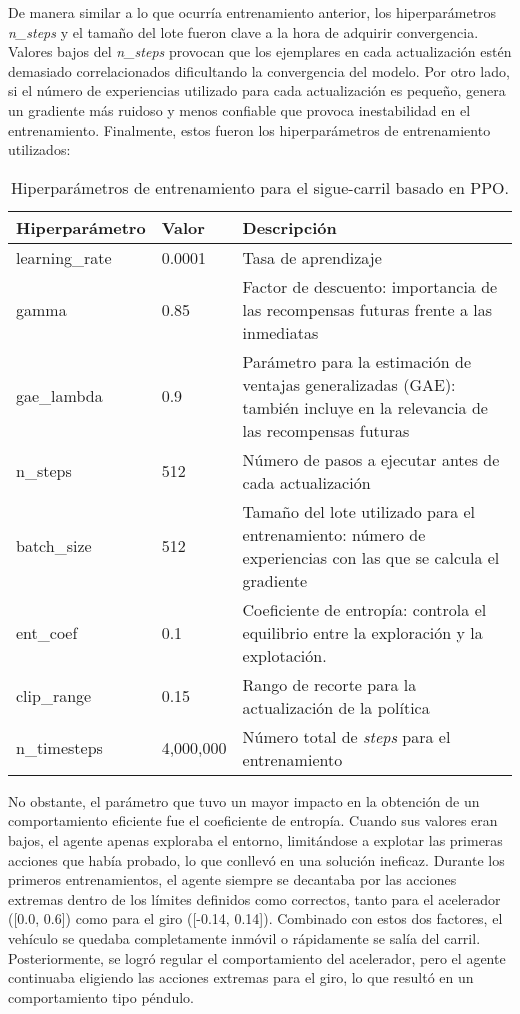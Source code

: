 De manera similar a lo que ocurría entrenamiento anterior, los hiperparámetros \textit{n\_steps} y el tamaño del lote fueron clave a la hora de adquirir convergencia. Valores bajos del \textit{n\_steps} provocan que los ejemplares en cada actualización estén demasiado correlacionados dificultando la convergencia del modelo. Por otro lado, si el número de experiencias utilizado para cada actualización es pequeño, genera un gradiente más ruidoso y menos confiable que provoca inestabilidad en el entrenamiento. Finalmente, estos fueron los hiperparámetros de entrenamiento utilizados:
\begin{table}[ht]
\centering
\begin{tabular}{|l|l|p{9cm}|}
\hline
\textbf{Hiperparámetro} & \textbf{Valor} & \textbf{Descripción} \\ \hline
learning\_rate & 0.0001 & Tasa de aprendizaje \\ \hline
gamma & 0.85 & Factor de descuento: importancia de las recompensas futuras frente a las inmediatas\\ \hline
gae\_lambda & 0.9 & Parámetro para la estimación de ventajas generalizadas (GAE): también incluye en la relevancia de las recompensas futuras \\ \hline
n\_steps & 512 & Número de pasos a ejecutar antes de cada actualización \\ \hline
batch\_size & 512 & Tamaño del lote utilizado para el entrenamiento: número de experiencias con las que se calcula el gradiente \\ \hline
ent\_coef & 0.1 & Coeficiente de entropía: controla el equilibrio entre la exploración y la explotación. \\ \hline
clip\_range & 0.15 & Rango de recorte para la actualización de la política \\ \hline
n\_timesteps & 4,000,000 & Número total de \textit{steps} para el entrenamiento \\ \hline
\end{tabular}
\caption{Hiperparámetros de entrenamiento para el sigue-carril basado en \ac{PPO}.}
\label{tab:hiper_params_ppo}
\end{table}

No obstante, el parámetro que tuvo un mayor impacto en la obtención de un comportamiento eficiente fue el coeficiente de entropía. Cuando sus valores eran bajos, el agente apenas exploraba el entorno, limitándose a explotar las primeras acciones que había probado, lo que conllevó en una solución ineficaz. Durante los primeros entrenamientos, el agente siempre se decantaba por las acciones extremas dentro de los límites definidos como correctos, tanto para el acelerador ([0.0, 0.6]) como para el giro ([-0.14, 0.14]). Combinado con estos dos factores, el vehículo se quedaba completamente inmóvil o rápidamente se salía del carril. Posteriormente, se logró regular el comportamiento del acelerador, pero el agente continuaba eligiendo las acciones extremas para el giro, lo que resultó en un comportamiento tipo péndulo. 

